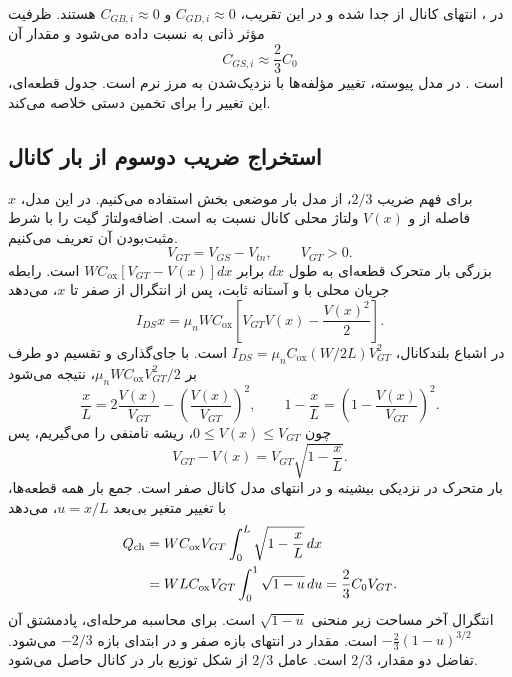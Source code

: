در ، انتهای کانال از  جدا شده و در این تقریب،
\(C_{GD,i}\approx0\) و \(C_{GB,i}\approx0\) هستند. ظرفیت مؤثر ذاتی به
 نسبت داده می‌شود و مقدار آن
\begin{equation}
 C_{GS,i}\approx\frac23C_0
 \label{eq:cv-sat-cap}
\end{equation}
است \cite[صفحه ۷۰ و جدول ]{weste}.
در مدل پیوسته، تغییر مؤلفه‌ها با نزدیک‌شدن به مرز نرم است.
جدول قطعه‌ای، این تغییر را برای تخمین دستی خلاصه می‌کند.

\clearpage
\subsection{استخراج ضریب دوسوم از بار کانال}
برای فهم ضریب \(2/3\)، از مدل بار موضعی بخش  استفاده می‌کنیم.
در این مدل، \(x\) فاصله از  و \(V(x)\) ولتاژ محلی کانال نسبت به
 است. اضافه‌ولتاژ گیت را با شرط مثبت‌بودن آن تعریف می‌کنیم.
\[
 V_{GT}=V_{GS}-V_{tn},\qquad V_{GT}>0.
\]
بزرگی بار متحرک قطعه‌ای به طول \(dx\)
برابر \(WC_{\mathrm{ox}}[V_{GT}-V(x)]dx\) است.
رابطه جریان محلی با  و آستانه ثابت، پس از انتگرال از صفر تا \(x\)، می‌دهد
\begin{equation*}
 I_{DS}x=\mu_nWC_{\mathrm{ox}}
 \left[V_{GT}V(x)-\frac{V(x)^2}{2}\right].
\end{equation*}
در اشباع بلندکانال، \(I_{DS}=\mu_nC_{\mathrm{ox}}(W/2L)V_{GT}^2\) است.
با جای‌گذاری و تقسیم دو طرف بر \(\mu_nWC_{\mathrm{ox}}V_{GT}^2/2\)، نتیجه می‌شود
\begin{equation*}
 \frac{x}{L}=2\frac{V(x)}{V_{GT}}-
 \left(\frac{V(x)}{V_{GT}}\right)^2,
 \qquad
 1-\frac{x}{L}=\left(1-\frac{V(x)}{V_{GT}}\right)^2.
\end{equation*}
چون \(0\le V(x)\le V_{GT}\)، ریشه نامنفی را می‌گیریم، پس
\begin{equation*}
 V_{GT}-V(x)=V_{GT}\sqrt{1-\frac{x}{L}}.
\end{equation*}
بار متحرک در نزدیکی  بیشینه و در انتهای مدل کانال صفر است.
جمع بار همه قطعه‌ها، با تغییر متغیر بی‌بعد \(u=x/L\)، می‌دهد
\begin{align}
 Q_{\mathrm{ch}}
 &=WC_{\mathrm{ox}}V_{GT}\int_0^L\sqrt{1-\frac{x}{L}}\,dx\notag\\
 &=WLC_{\mathrm{ox}}V_{GT}\int_0^1\sqrt{1-u}\,du
 =\frac23 C_0V_{GT}.
 \label{eq:cv-sat-charge}
\end{align}
انتگرال آخر مساحت زیر منحنی \(\sqrt{1-u}\) است. برای محاسبه مرحله‌ای،
پادمشتق آن \(-\tfrac23(1-u)^{3/2}\) است. مقدار در انتهای بازه صفر و در
ابتدای بازه \(-2/3\) می‌شود. تفاضل دو مقدار، \(2/3\) است.
عامل \(2/3\) از شکل توزیع بار در کانال حاصل می‌شود.

